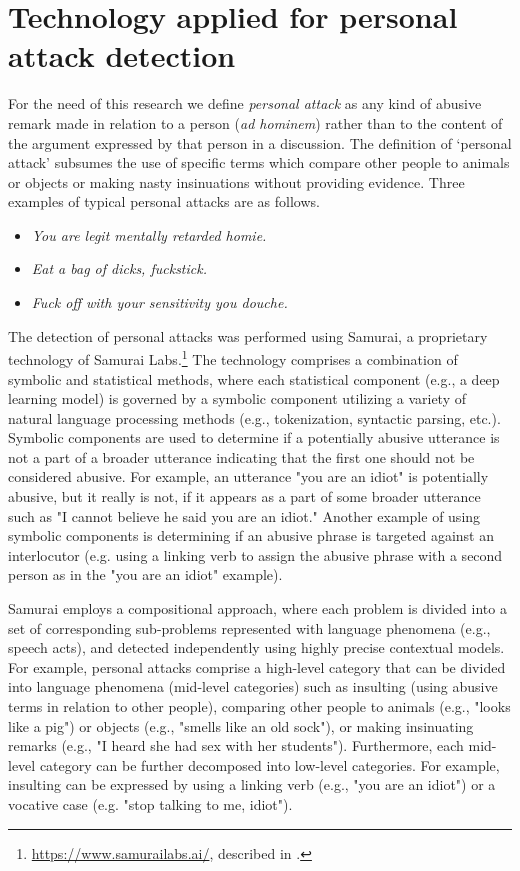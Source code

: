 \documentclass[a4paper,fleqn]{cas-dc}
\begin{document}
\section{Technology applied for personal attack detection}
\label{technology}

For the need of this research we define \textit{personal attack} as any kind of abusive remark made in relation to a person (\textit{ad hominem}) rather than to the content of the argument expressed by that person in a discussion. The definition of `personal attack' subsumes the use of specific terms which compare other people to animals or objects or making nasty insinuations without providing evidence. Three examples of typical personal attacks are as follows.

\begin{itemize} 
\item \emph{You are legit mentally retarded homie.}
\item \emph {Eat a bag of dicks, fuckstick.}
\item \emph {Fuck off with your sensitivity you douche.} 
\end{itemize}

The detection of personal attacks was performed using  Samurai, a proprietary technology of Samurai Labs.\footnote{\url{https://www.samurailabs.ai/}, described in \citep{ptaszynski2018cyberbullying,wroczynski2019system}.}
 The technology comprises a combination of symbolic and statistical methods, where each statistical component (e.g., a deep learning model) is governed by a symbolic component utilizing a variety of natural language processing methods (e.g., tokenization, syntactic parsing, etc.). Symbolic components are used to determine if a potentially abusive utterance is not a part of a broader utterance indicating that the first one should not be considered abusive. For example, an utterance "you are an idiot" is potentially abusive, but it really is not, if it appears as a part of some broader utterance such as "I cannot believe he said you are an idiot." Another example of using symbolic components is determining if an abusive phrase is targeted against an interlocutor (e.g. using a linking verb to assign the abusive phrase with a second person as in the "you are an idiot" example).

 Samurai \citep{wroczynski2019system} employs a  compositional approach, where each problem is divided into a set of corresponding sub-problems represented with language phenomena (e.g., speech acts), and detected independently using highly precise contextual models. For example, personal attacks comprise a high-level category that can be divided into language phenomena (mid-level categories) such as insulting (using abusive terms in relation to other people), comparing other people to animals (e.g., "looks like a pig") or objects (e.g., "smells like an old sock"), or making insinuating remarks (e.g., "I heard she had sex with her students"). Furthermore, each mid-level category can be further decomposed into low-level categories. For example, insulting can be expressed by using a linking verb (e.g., "you are an idiot") or a vocative case (e.g. "stop talking to me, idiot").
\end{document}
